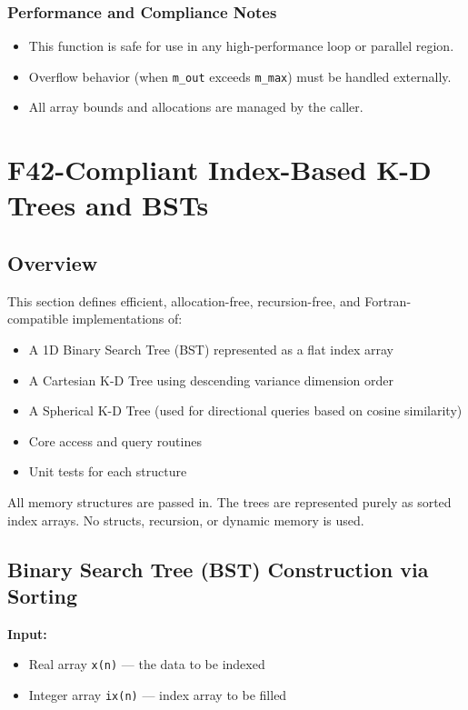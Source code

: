 \documentclass{article}
\begin{document}
\subsubsection{Performance and Compliance Notes}

\begin{itemize}
  \item This function is safe for use in any high-performance loop or parallel region.
  \item Overflow behavior (when \texttt{m\_out} exceeds \texttt{m\_max}) must be handled externally.
  \item All array bounds and allocations are managed by the caller.
\end{itemize}

\section{F42-Compliant Index-Based K-D Trees and BSTs}

\subsection{Overview}

This section defines efficient, allocation-free, recursion-free, and Fortran-compatible implementations of:
\begin{itemize}
    \item A 1D Binary Search Tree (BST) represented as a flat index array
    \item A Cartesian K-D Tree using descending variance dimension order
    \item A Spherical K-D Tree (used for directional queries based on cosine similarity)
    \item Core access and query routines
    \item Unit tests for each structure
\end{itemize}

All memory structures are passed in. The trees are represented purely as sorted index arrays. No structs, recursion, or dynamic memory is used.

\subsection{Binary Search Tree (BST) Construction via Sorting}

\textbf{Input:}
\begin{itemize}
    \item Real array \texttt{x(n)} --- the data to be indexed
    \item Integer array \texttt{ix(n)} --- index array to be filled
\end{itemize}
\end{document}
